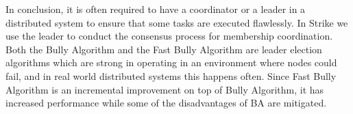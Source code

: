 \documentclass[dareport.tex]{subfiles}
\begin{document}
In conclusion, it is often required to have a coordinator or a leader in a distributed system to ensure that some tasks are executed flawlessly. In Strike we use the leader to conduct the consensus process for membership coordination. Both the Bully Algorithm and the Fast Bully Algorithm are leader election algorithms which are strong in operating in an environment where nodes could fail, and in real world distributed systems this happens often. Since Fast Bully Algorithm is an incremental improvement on top of Bully Algorithm, it has increased performance while some of the disadvantages of BA are mitigated.
\end{document}

